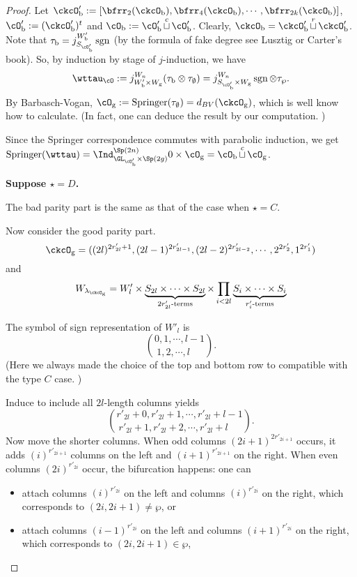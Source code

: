 \documentclass[12pt,a4paper]{amsart}
\newcommand{\sgn}{\operatorname{sgn}}
\numberwithin{equation}{section}
\theoremstyle{remark}
\def\lamckg{\lambda_{\ckcO_{\mathrm g}}}
\def\cuprow{{\stackrel{r}{\sqcup}}}
\def\cupcol{{\stackrel{c}{\sqcup}}}
\def\Spr{\mathrm{Springer}}
\def\cuprow{{\,\stackrel{r}{\sqcup}\,}}
\def\cupcol{{\,\stackrel{c}{\sqcup}\,}}
\begin{document}
\begin{proof}
{      Let
      $\ckcO'_{\mathrm b}: = [\bfrr_{2}(\ckcO_{\mathrm b}), \bfrr_{4}(\ckcO_{\mathrm b}),\cdots, \bfrr_{2k}(\ckcO_{\mathrm b})]$,
      $\cO'_{\mathrm b}:=(\ckcO'_{\mathrm b})^{t}$ and $\cO_{\mathrm b}:=\cO'_{\mathrm b}\cupcol \cO'_{\mathrm b}$.
      Clearly, $\ckcO_{\mathrm b} = \ckcO'_{\mathrm b}\cuprow \ckcO'_{\mathrm b}$. Note that
      $\tau_{\mathrm b} = j_{S_{\cO'_{\mathrm b}}}^{W'_{\mathrm b}} \sgn$ (by the formula of fake degree
      see Lusztig or Carter's book). So, by induction by stage of $j$-induction,
      we have
      \[
        \wttau_{\cO}:= j_{W'_{\mathrm b}\times W_{\mathrm g}}^{W_{n}} (\tau_{\mathrm b}\otimes \tau_{\emptyset}) = j_{S_{\cO'_{\mathrm b}}\times W_{\mathrm g}}^{W_{n}} \sgn\otimes \tau_{\wp}.
      \]
      By Barbasch-Vogan, $\cO_{\mathrm g}:=\Spr(\tau_{\emptyset}) = d_{BV}(\ckcO_{\mathrm g})$,
      which is well know how to calculate. (In fact, one can deduce the result
      by our computation. )

      Since the Springer correspondence commutes with parabolic induction, we
      get
      $\Spr(\wttau) = \Ind_{\GL_{\cO'_{\mathrm b}}\times \Sp(2g)}^{\Sp(2n)} 0\times \cO_{\mathrm g} = \cO_{\mathrm b}\cupcol \cO_{\mathrm g}$.


      \medskip

      {\bf Suppose $\star=D$.}

      The bad parity part is the same as that of the case when $\star = C$.

      Now consider the good parity part.
      \[
        \ckcO_{\mathrm g} = ((2l)^{2r'_{2l}+1}, (2l-1)^{2r'_{2l-1}}, (2l-2)^{2r'_{2l-2}}, \cdots, 2^{2r'_{2}}, 1^{2r'_{1}} )
      \]
      and
      \[
        W_{\lamckg} = W'_{l}\times \underbrace{S_{2l}\times \cdots \times S_{2l}}_{2r'_{2l}\text{-terms}} \times \prod_{i<2l} \underbrace{S_{i}\times \cdots\times S_{i}}_{r'_{i}\text{-terms}}
      \]

      The symbol of sign representation of $W'_{l}$ is
      \[
        \binom{0,1, \cdots, l-1}{1,2, \cdots, l\phantom{-1}}.
      \]
      (Here we always made the choice of the top and bottom row to compatible
      with the type $C$ case. )

      Induce to include all $2l$-length columns yields
      \[
        \binom{r'_{2l}+0,r'_{2l}+1, \cdots, r'_{2l}+l-1}{ r'_{2l}+1,r'_{2l}+2, \cdots, r'_{2l}+l\phantom{-1}}.
      \]
      Now move the shorter columns. When odd columns $(2i+1)^{2r'_{2i+1}}$
      occurs, it adds $(i)^{r'_{2i+1}}$ columns on the left and
      $(i+1)^{r'_{2i+1}}$ on the right. When even columns $(2i)^{r'_{2i}}$
      occur, the bifurcation happens: one can
      \begin{itemize}
        \item attach columns $(i)^{r'_{2i}}$ on the left and columns
              $(i)^{r'_{2i}}$ on the right, which corresponds to
              $(2i,2i+1)\neq \wp$, or
        \item attach columns $(i-1)^{r'_{2i}}$ on the left and columns
              $(i+1)^{r'_{2i}}$ on the right, which corresponds to
              $(2i,2i+ 1)\in \wp$,
      \end{itemize}

}
\end{proof}
\end{document}
